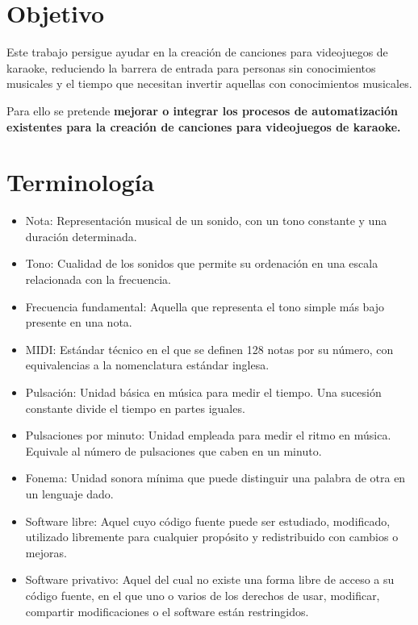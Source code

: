 \section{Objetivo}

Este trabajo persigue ayudar en la creación de canciones para videojuegos de karaoke, reduciendo la barrera de entrada para personas sin conocimientos musicales y el tiempo que necesitan invertir aquellas con conocimientos musicales.


Para ello se pretende \textbf{mejorar o integrar los procesos de automatización existentes para la creación de canciones para videojuegos de karaoke.}

\section{Terminología}

\begin{itemize}
	\item{Nota: Representación musical de un sonido, con un tono constante y una duración determinada.}
	\item{Tono: Cualidad de los sonidos que permite su ordenación en una escala relacionada con la frecuencia.}
	\item{Frecuencia fundamental: Aquella que representa el tono simple más bajo presente en una nota.}
	\item{MIDI: Estándar técnico en el que se definen 128 notas por su número, con equivalencias a la nomenclatura estándar inglesa.}
	\item{Pulsación: Unidad básica en música para medir el tiempo. Una sucesión constante divide el tiempo en partes iguales.}
	\item{Pulsaciones por minuto: Unidad empleada para medir el ritmo en música. Equivale al número de pulsaciones que caben en un minuto.}
	\item{Fonema: Unidad sonora mínima que puede distinguir una palabra de otra en un lenguaje dado.}
	\item{Software libre: Aquel cuyo código fuente puede ser estudiado, modificado, utilizado libremente para cualquier propósito y redistribuido con cambios o mejoras.}
	\item{Software privativo: Aquel del cual no existe una forma libre de acceso a su código fuente, en el que uno o varios de los derechos de usar, modificar, compartir modificaciones o el software están restringidos.}
\end{itemize}